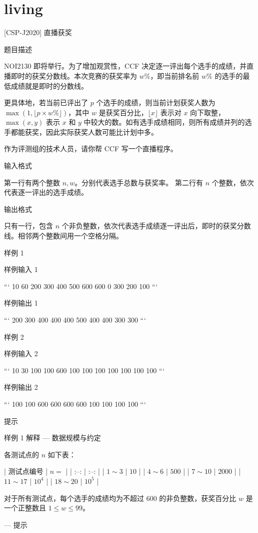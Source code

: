 \documentclass[12pt,twiside,a4paper]{ctexbook}
\numberwithin{chapter}{part}
\begin{document}
\section{living}
 [CSP-J2020] 直播获奖

 题目描述

NOI2130 即将举行。为了增加观赏性，CCF 决定逐一评出每个选手的成绩，并直播即时的获奖分数线。本次竞赛的获奖率为 $w\%$，即当前排名前 $w\%$ 的选手的最低成绩就是即时的分数线。

更具体地，若当前已评出了 $p$ 个选手的成绩，则当前计划获奖人数为 $\max(1, \lfloor p \times w \%\rfloor)$，其中 $w$ 是获奖百分比，$\lfloor x \rfloor$ 表示对 $x$ 向下取整，$\max(x,y)$ 表示 $x$ 和 $y$ 中较大的数。如有选手成绩相同，则所有成绩并列的选手都能获奖，因此实际获奖人数可能比计划中多。

作为评测组的技术人员，请你帮 CCF 写一个直播程序。

 输入格式

第一行有两个整数 $n, w$。分别代表选手总数与获奖率。  
第二行有 $n$ 个整数，依次代表逐一评出的选手成绩。

 输出格式

只有一行，包含 $n$ 个非负整数，依次代表选手成绩逐一评出后，即时的获奖分数线。相邻两个整数间用一个空格分隔。

 样例 1

 样例输入 1

```
10 60
200 300 400 500 600 600 0 300 200 100
```

 样例输出 1

```
200 300 400 400 400 500 400 400 300 300
```

 样例 2

 样例输入 2

```
10 30
100 100 600 100 100 100 100 100 100 100
```

 样例输出 2

```
100 100 600 600 600 600 100 100 100 100
```

 提示

 样例 1 解释
---
 数据规模与约定

各测试点的 $n$ 如下表：

| 测试点编号 | $n=$ |
| :--: | :--: |
| $1 \sim 3$ | $10$ |
| $4 \sim 6$ | $500$ |
| $7 \sim 10$ | $2000$ |
| $11 \sim 17$ | $10^4$ |
| $18 \sim 20$ | $10^5$ |


对于所有测试点，每个选手的成绩均为不超过 $600$ 的非负整数，获奖百分比 $w$ 是一个正整数且 $1 \le w \le 99$。

---
 提示
\end{document}
